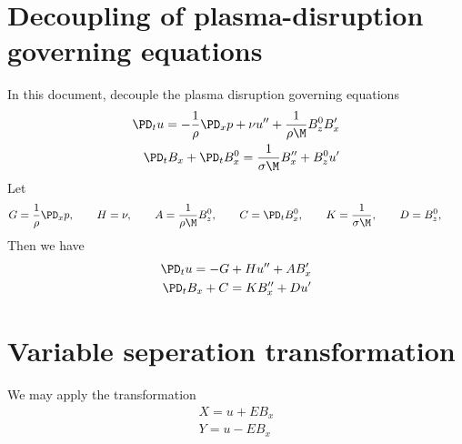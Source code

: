 \documentclass[11pt]{article}
\begin{document}
\doublespacing
\MOONSTITLE
\maketitle

\section{Decoupling of plasma-disruption governing equations}
In this document, decouple the plasma disruption governing equations
\begin{equation}\begin{aligned}
\PD_t u                 = -\frac{1}{\rho}\PD_x p+ \nu u'' + \frac{1}{\rho \M} B_z^0 B_x' \\
\PD_t B_x + \PD_t B_x^0 = \frac{1}{\sigma \M} B_x'' + B_z^0 u' \\
\end{aligned} \end{equation}
Let
\begin{equation}\begin{aligned}
G = \frac{1}{\rho}\PD_x p, \qquad
H = \nu, \qquad
A = \frac{1}{\rho \M} B_z^0, \qquad
C = \PD_t B_x^0, \qquad
K = \frac{1}{\sigma \M}, \qquad
D = B_z^0, \qquad
\end{aligned} \end{equation}
Then we have
\begin{equation}\begin{aligned}
\PD_t u                 = -G+ H u'' + A B_x' \\
\PD_t B_x + C = K B_x'' + D u' \\
\end{aligned} \end{equation}

\section{Variable seperation transformation}
We may apply the transformation
\begin{equation}\begin{aligned}
X = u + E B_x \\
Y = u - E B_x \\
\end{aligned} \end{equation}
\end{document}
